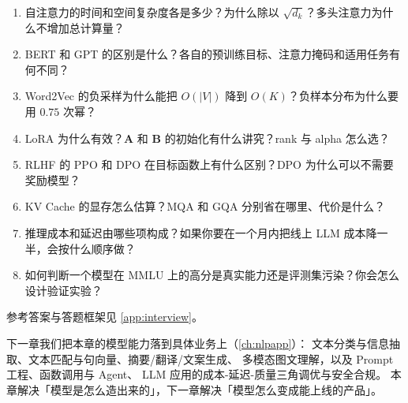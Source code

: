 \begin{interview}[本章对应的面试题]
\begin{enumerate}
  \item 自注意力的时间和空间复杂度各是多少？为什么除以 $\sqrt{d_k}$？多头注意力为什么不增加总计算量？
  \item BERT 和 GPT 的区别是什么？各自的预训练目标、注意力掩码和适用任务有何不同？
  \item Word2Vec 的负采样为什么能把 $O(|V|)$ 降到 $O(K)$？负样本分布为什么要用 $0.75$ 次幂？
  \item LoRA 为什么有效？$\bm{A}$ 和 $\bm{B}$ 的初始化有什么讲究？rank 与 alpha 怎么选？
  \item RLHF 的 PPO 和 DPO 在目标函数上有什么区别？DPO 为什么可以不需要奖励模型？
  \item KV Cache 的显存怎么估算？MQA 和 GQA 分别省在哪里、代价是什么？
  \item 推理成本和延迟由哪些项构成？如果你要在一个月内把线上 LLM 成本降一半，会按什么顺序做？
  \item 如何判断一个模型在 MMLU 上的高分是真实能力还是评测集污染？你会怎么设计验证实验？
\end{enumerate}
参考答案与答题框架见 \cref{app:interview}。
\end{interview}

下一章我们把本章的模型能力落到具体业务上（\cref{ch:nlpapp}）：
文本分类与信息抽取、文本匹配与句向量、摘要/翻译/文案生成、
多模态图文理解，以及 Prompt 工程、函数调用与 Agent、
LLM 应用的成本-延迟-质量三角调优与安全合规。
本章解决「模型是怎么造出来的」，下一章解决「模型怎么变成能上线的产品」。
